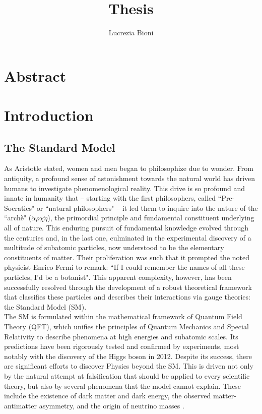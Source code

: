 \documentclass[a4paper, 12pt]{book}
\title{Thesis}
\author{Lucrezia Bioni}
\begin{document}
\frontmatter

\clearpage

\chapter*{Abstract}


\newpage

\toc

\pagestyle{contents}

\mainmatter

\chapter{Introduction}

\section{The Standard Model}

As Aristotle stated, women and men began to philosophize due to wonder. From antiquity, a profound sense of astonishment towards the natural world has driven humans to investigate phenomenological reality. This drive is so profound and innate in humanity that – starting with the first philosophers, called ``Pre-Socratics"  or ``natural philosophers" – it led them to inquire into the nature of the ``archè" ($\acute{\alpha}\rho\chi\acute{\eta}$), the primordial principle and fundamental constituent underlying all of nature. This enduring pursuit of fundamental knowledge evolved through the centuries and, in the last one, culminated in the experimental discovery of a multitude of subatomic particles, now understood to be the elementary constituents of matter. Their proliferation was such that it prompted the noted physicist Enrico Fermi to remark: ``If I could remember the names of all these particles, I'd be a botanist". This apparent complexity, however, has been successfully resolved through the development of a robust theoretical framework that classifies these particles and describes their interactions via gauge theories: the Standard Model (SM). \\
The SM is formulated within the mathematical framework of Quantum Field Theory (QFT), which unifies the principles of Quantum Mechanics and Special Relativity to describe phenomena at high energies and subatomic scales. Its predictions have been rigorously tested and confirmed by experiments, most notably with the discovery of the Higgs boson in 2012.  Despite its success, there are significant efforts to discover Physics beyond the SM. This is driven not only by the natural attempt at falsification that should be applied to every scientific theory, but also by several phenomena that the model cannot explain. These include the existence of dark matter and dark energy, the observed matter-antimatter asymmetry, and the origin of neutrino masses \cite{Campbell:2017}. \\
\end{document}
